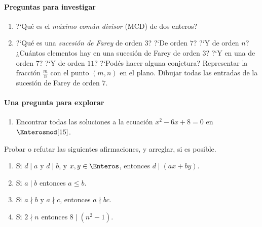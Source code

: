 \paragraph{Preguntas para investigar}

\begin{enumerate}[label=P\arabic*]
	\item\label{item:mcd}
		?`Qu\'e es el \emph{m\'aximo com\'un divisor} (MCD) de dos enteros?
	\item\label{item:farey}
		?`Qu\'e es una \emph{sucesión de Farey} de orden $3$?
		?`De orden $7$? ?`Y de orden $n$? ¿Cu\'antos elementos hay en una sucesi\'on de
		Farey de orden $3$? ?`Y en una de orden $7$? ?`Y de orden $11$?
		?`Pod\'es hacer alguna conjetura? Representar la fracci\'on $\frac m n$ con el punto
		$(m,n)$ en el plano. Dibujar todas las entradas de la sucesi\'on de Farey de orden $7$.
	\seti
\end{enumerate}
%

\paragraph{Una pregunta para explorar}
\begin{enumerate}[label=P\arabic*]
	\conti
	\item\label{item:cuadratica}
		Encontrar todas las soluciones a la ecuaci\'on $x^2-6x+8=0$ en $\Enterosmod[15]$.
	\seti
\end{enumerate}
%

Probar o refutar las siguientes afirmaciones, y arreglar, si es posible.
\begin{enumerate}[label=P\arabic*]
	\conti
	\item\label{item:divisibilidad:combinacion}
		Si $d\mid a$ y $d\mid b$, y $x,y\in\Enteros$, entonces $d\mid (ax+by)$.
	\item\label{item:divisibilidad:orden}
		Si $a\mid b$ entonces $a\leq b$.
	\item\label{item:divisibilidad:negativa}
		Si $a\nmid b$ y $a\nmid c$, entonces $a\nmid bc$.
	\item\label{item:divisibilidad:ocho}
		Si $2\nmid n$ entonces $8\mid (n^2-1)$.
	\seti
\end{enumerate}
%

